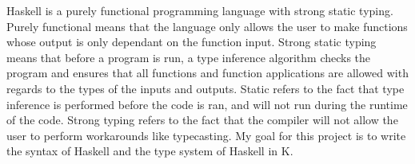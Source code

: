 Haskell is a purely functional programming language with strong static typing. Purely functional means that the language only allows the user to make functions whose output is only dependant on the function input. Strong static typing means that before a program is run, a type inference algorithm checks the program and ensures that all functions and function applications are allowed with regards to the types of the inputs and outputs. Static refers to the fact that type inference is performed before the code is ran, and will not run during the runtime of the code. Strong typing refers to the fact that the compiler will not allow the user to perform workarounds like typecasting.
My goal for this project is to write the syntax of Haskell and the type system of Haskell in K.